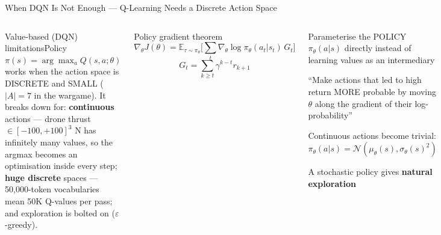 \documentclass[aspectratio=169,10pt,t]{beamer}
\begin{document}

\begin{frame}{When DQN Is Not Enough --- Q-Learning Needs a Discrete Action Space}
\begin{columns}[T]
\begin{cbox}[ISSAred]{Value-based (DQN) limitations}\scriptsize Policy $\pi(s)=\arg\max_aQ(s,a;\theta)$ works when the action space is DISCRETE and SMALL ($|A|=7$ in the wargame). It breaks down for: \textbf{continuous} actions --- drone thrust $\in[-100,+100]^3$ N has infinitely many values, so the argmax becomes an optimisation inside every step; \textbf{huge discrete} spaces --- 50,000-token vocabularies mean 50K Q-values per pass; and exploration is bolted on ($\varepsilon$-greedy).\end{cbox}
\begin{fbx}{Policy gradient theorem}\[\nabla_\theta J(\theta)=\mathbb{E}_{\tau\sim\pi_\theta}\Big[\sum_t\nabla_\theta\log\pi_\theta(a_t|s_t)\,G_t\Big]\]\[G_t=\sum_{k\ge t}\gamma^{k-t}r_{k+1}\]\end{fbx}
\begin{tl}\item Parameterise the POLICY $\pi_\theta(a|s)$ directly instead of learning values as an intermediary\item ``Make actions that led to high return MORE probable by moving $\theta$ along the gradient of their log-probability''\item Continuous actions become trivial: $\pi_\theta(a|s)=\mathcal{N}(\mu_\theta(s),\sigma_\theta(s)^2)$\item A stochastic policy gives \textbf{natural exploration}\end{tl}
\end{columns}
\end{frame}
\end{document}
